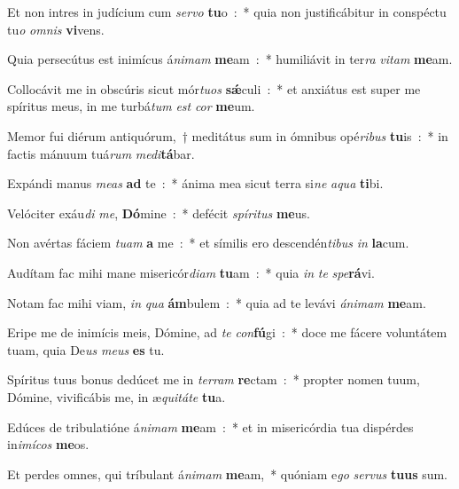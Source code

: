 ﻿\item Et non intres in judícium cum \emph{ser}\emph{vo} \textbf{tu}o~:~* quia non justificábitur in conspéctu tu\emph{o} \emph{om}\emph{nis} \textbf{vi}vens.
\item Quia persecútus est inimícus á\emph{ni}\emph{mam} \textbf{me}am~:~* humiliávit in ter\emph{ra} \emph{vi}\emph{tam} \textbf{me}am.
\item Collocávit me in obscúris sicut mór\emph{tu}\emph{os} \textbf{sǽ}culi~:~* et anxiátus est super me spíritus meus, in me turbá\emph{tum} \emph{est} \emph{cor} \textbf{me}um.
\item Memor fui diérum antiquórum,~† meditátus sum in ómnibus opé\emph{ri}\emph{bus} \textbf{tu}is~:~* in factis mánuum tuá\emph{rum} \emph{me}\emph{di}\textbf{tá}bar.
\item Expándi manus \emph{me}\emph{as} \textbf{ad} te~:~* ánima mea sicut terra si\emph{ne} \emph{a}\emph{qua} \textbf{ti}bi.
\item Velóciter exáu\emph{di} \emph{me}, \textbf{Dó}mine~:~* defécit \emph{spí}\emph{ri}\emph{tus} \textbf{me}us.
\item Non avértas fáciem \emph{tu}\emph{am} \textbf{a} me~:~* et símilis ero descendén\emph{ti}\emph{bus} \emph{in} \textbf{la}cum.
\item Audítam fac mihi mane misericór\emph{di}\emph{am} \textbf{tu}am~:~* quia \emph{in} \emph{te} \emph{spe}\textbf{rá}vi.
\item Notam fac mihi viam, \emph{in} \emph{qua} \textbf{ám}bulem~:~* quia ad te levávi \emph{á}\emph{ni}\emph{mam} \textbf{me}am.
\item Eripe me de inimícis meis, Dómine, ad \emph{te} \emph{con}\textbf{fú}gi~:~* doce me fácere voluntátem tuam, quia De\emph{us} \emph{me}\emph{us} \textbf{es} tu.
\item Spíritus tuus bonus dedúcet me in \emph{ter}\emph{ram} \textbf{re}ctam~:~* propter nomen tuum, Dómine, vivificábis me, in æ\emph{qui}\emph{tá}\emph{te} \textbf{tu}a.
\item Edúces de tribulatióne á\emph{ni}\emph{mam} \textbf{me}am~:~* et in misericórdia tua dispérdes in\emph{i}\emph{mí}\emph{cos} \textbf{me}os.
\item Et perdes omnes, qui tríbulant á\emph{ni}\emph{mam} \textbf{me}am,~* quóniam e\emph{go} \emph{ser}\emph{vus} \textbf{tu}\textbf{us} sum.